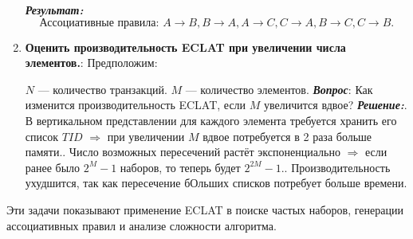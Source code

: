 \begin{enumerate}
{    \textbf{\textit{Результат:}}\newline
    \[
    \text{Ассоциативные правила: } A \rightarrow B, B \rightarrow A, A \rightarrow C, C \rightarrow A, B \rightarrow C, C \rightarrow B.
    \]}
    \item {\textbf{Оценить производительность ECLAT при увеличении числа элементов.}:\newline
    Предположим:\par
    \(N\) — количество транзакций.\newline
    \(M\) — количество элементов.\newline
    \textbf{\textit{Вопрос}}: Как изменится производительность ECLAT, если \(M\) увеличится вдвое?\newline
    \textbf{\textit{Решение:}}. В вертикальном представлении для каждого элемента требуется хранить его список \(TID\) $\Rightarrow$ при увеличении \(M\) вдвое потребуется в 2 раза больше памяти.. Число возможных пересечений растёт экспоненциально $\Rightarrow$ если ранее было \(2^M - 1\) наборов, то теперь будет \(2^{2M} - 1\).. Производительность ухудшится, так как пересечение бОльших списков потребует больше времени.\newline}
\end{enumerate}
Эти задачи показывают применение ECLAT в поиске частых наборов, генерации ассоциативных правил и анализе сложности алгоритма.
